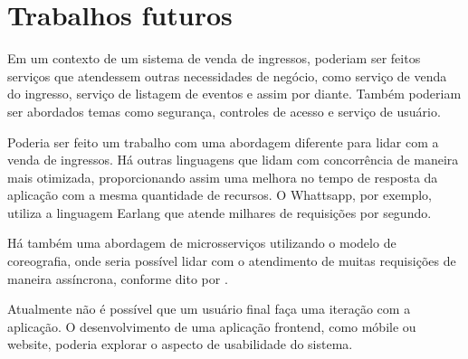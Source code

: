 
\chapter*[Trabalhos futuros]{Trabalhos futuros}\label{trabalhos-futuros}



Em um contexto de um sistema de venda de ingressos, poderiam ser feitos serviços que atendessem
outras necessidades de negócio, como serviço de venda do ingresso, serviço de listagem de eventos
e assim por diante.
Também poderiam ser abordados temas como segurança, controles de acesso e serviço de usuário.

Poderia ser feito um trabalho com uma abordagem diferente para lidar com a venda de ingressos.
Há outras linguagens que lidam com concorrência de maneira mais otimizada,
proporcionando assim uma melhora no tempo de resposta da aplicação com a mesma quantidade
de recursos.
O Whattsapp, por exemplo, utiliza a linguagem Earlang  que
atende milhares de requisições por segundo.

Há também uma abordagem de microsserviços utilizando o modelo de coreografia, onde seria possível
lidar com o atendimento de muitas requisições de maneira assíncrona, conforme dito por
\cite{scaling-microservices-event-stream}.

Atualmente não é possível que um usuário final faça uma iteração com a aplicação. O desenvolvimento
de uma aplicação frontend, como móbile ou website, poderia explorar o aspecto de usabilidade
do sistema.
